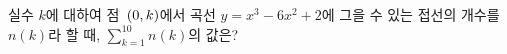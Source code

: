 실수 $k$에 대하여 점~$(0{,}\mkern3mu\mathopen{}k)$에서 곡선 $y=x^3-6x^2+2$에 그을 수 있는 접선의 개수를 $n(k)$라 할 때, $\displaystyle\sum_{k=1}^{10}n(k)$의 값은?
